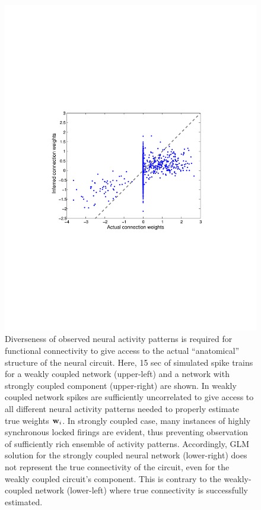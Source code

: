 \begin{figure}[h]
\begin{minipage}[c]{0.45\hsize}
\includegraphics[width=\hsize]{../figs/FigureA8_strong_corr}
\end{minipage}
\caption{
Diverseness of observed neural activity patterns is required for
functional connectivity to give access to the actual ``anatomical'' structure 
of the neural circuit. Here, 15 sec of simulated spike trains for a weakly coupled network (upper-left) and a network with strongly coupled component (upper-right) are shown. 
In weakly coupled network spikes are sufficiently uncorrelated to give access to all different neural activity patterns needed to properly estimate true weights ${\bf w}_i$. In strongly coupled case, many instances of highly synchronous locked firings are evident, thus preventing observation of sufficiently rich ensemble of activity patterns.
Accordingly, GLM solution for the strongly coupled neural network (lower-right) does not
represent the true connectivity of the circuit, even for the weakly coupled circuit's component. This is contrary to the weakly-coupled network (lower-left) where true connectivity is successfully estimated.}
\label{fig:rasters}
\end{figure}

